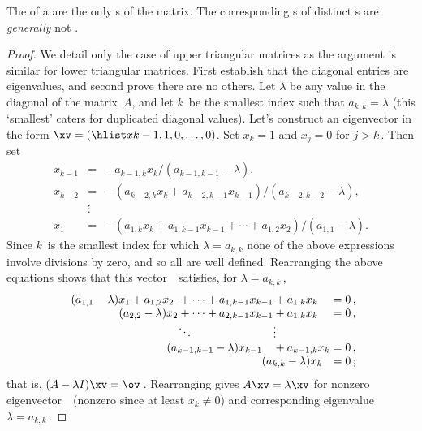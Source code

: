 \begin{theorem} \label{thm:trieig} 
The  of a  are the only s of the matrix.  
The corresponding s of distinct s are \emph{generally} not .
\end{theorem}

\begin{proof} 
We detail only the case of upper triangular matrices as the argument is similar for lower triangular matrices. 
First establish that the diagonal entries are eigenvalues, and second prove there are no others.
Let \(\lambda\) be any value in the diagonal of the matrix~\(A\), and let \(k\)~be the smallest index such that \(a_{k,k}=\lambda\) (this `smallest' caters for duplicated diagonal values).
Let's construct an eigenvector in the form \(\xv=(\hlist x{k-1},1,0,\ldots,0)\).  
Set \(x_k=1\) and \(x_j=0\) for \(j>k\)\,.
Then set 
\begin{eqnarray*}
x_{k-1}&=&-a_{k-1,k}x_k/(a_{k-1,k-1}-\lambda),
\\x_{k-2}&=&-(a_{k-2,k}x_k+a_{k-2,k-1}x_{k-1})/(a_{k-2,k-2}-\lambda),
\\&\vdots&
\\x_1&=&-(a_{1,k}x_k+a_{1,k-1}x_{k-1}+\cdots+a_{1,2}x_2)/(a_{1,1}-\lambda).
\end{eqnarray*}
Since \(k\)~is the smallest index for which \(\lambda=a_{k,k}\) none of the above expressions involve divisions by zero, and so all are well defined.
Rearranging the above equations shows that this vector~\xv\ satisfies, for  \(\lambda=a_{k,k}\)\,,
\begin{equation*}
\begin{array}{l@{}l@{}l@{}l@{}l@{}l}
(a_{1,1}-\lambda)x_1
&{}+a_{1,2}x_2
&{}+\cdots+a_{1,k-1}x_{k-1}
&{}+a_{1,k}x_k
&{}=0\,,
\\&\hspace{-1em}
(a_{2,2}-\lambda)x_2
&{}+\cdots+a_{2,k-1}x_{k-1}
&{}+a_{1,k}x_k
&{}=0\,,
\\&&\ddots&\vdots
\\&&\hspace{-1em}
(a_{k-1,k-1}-\lambda)x_{k-1}
&{}+a_{k-1,k}x_k
&{}=0\,,
\\&&&\hspace{-1em}
(a_{k,k}-\lambda)x_k
&{}=0\,;
\end{array}
\end{equation*}
that is, \((A-\lambda I)\xv=\ov\)\,.
Rearranging gives \(A\xv=\lambda\xv\) for nonzero eigenvector~\xv\ (nonzero since at least \(x_k\neq 0\)) and corresponding eigenvalue~\(\lambda=a_{k,k}\)\,.


\end{proof}
